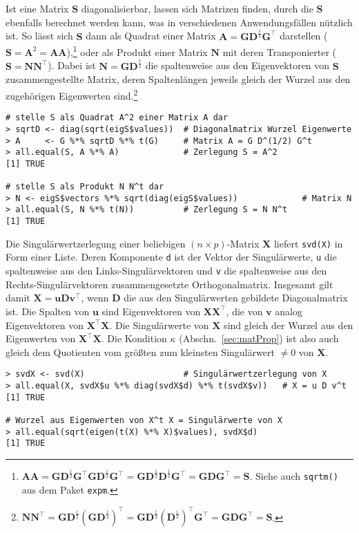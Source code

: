Ist eine Matrix $\bm{S}$ diagonalisierbar, lassen sich Matrizen finden, durch die $\bm{S}$ ebenfalls berechnet werden kann, was in verschiedenen Anwendungsfällen nützlich ist. So lässt sich $\bm{S}$ dann als Quadrat einer Matrix $\bm{A} = \bm{G} \bm{D}^{\frac{1}{2}} \bm{G}^{\top}$ darstellen ($\bm{S} = \bm{A}^{2} = \bm{A} \bm{A}$),\footnote{$\bm{A} \bm{A} = \bm{G} \bm{D}^{\frac{1}{2}} \bm{G}^{\top} \bm{G} \bm{D}^{\frac{1}{2}} \bm{G}^{\top} = \bm{G} \bm{D}^{\frac{1}{2}} \bm{D}^{\frac{1}{2}} \bm{G}^{\top} = \bm{G} \bm{D} \bm{G}^{\top} = \bm{S}$. Siehe auch \lstinline!sqrtm()! aus dem Paket \lstinline!expm!.} oder als Produkt einer Matrix $\bm{N}$ mit deren Transponierter ($\bm{S} = \bm{N} \bm{N}^{\top}$). Dabei ist $\bm{N} = \bm{G} \bm{D}^{\frac{1}{2}}$ die spaltenweise aus den Eigenvektoren von $\bm{S}$ zusammengestellte Matrix, deren Spaltenlängen jeweils gleich der Wurzel aus den zugehörigen Eigenwerten sind.\footnote{$\bm{N} \bm{N}^{\top} = \bm{G} \bm{D}^{\frac{1}{2}} (\bm{G} \bm{D}^{\frac{1}{2}})^{\top} = \bm{G} \bm{D}^{\frac{1}{2}} (\bm{D}^{\frac{1}{2}})^{\top} \bm{G}^{\top} = \bm{G} \bm{D} \bm{G}^{\top} = \bm{S}$.}
\begin{lstlisting}
# stelle S als Quadrat A^2 einer Matrix A dar
> sqrtD <- diag(sqrt(eigS$values))  # Diagonalmatrix Wurzel Eigenwerte
> A     <- G %*% sqrtD %*% t(G)     # Matrix A = G D^(1/2) G^t
> all.equal(S, A %*% A)             # Zerlegung S = A^2
[1] TRUE

# stelle S als Produkt N N^t dar
> N <- eigS$vectors %*% sqrt(diag(eigS$values))             # Matrix N
> all.equal(S, N %*% t(N))          # Zerlegung S = N N^t
[1] TRUE
\end{lstlisting}

Die Singulärwertzerlegung einer beliebigen $(n \times p)$-Matrix $\bm{X}$ liefert  \lstinline!svd(X)! in Form einer Liste. Deren Komponente \lstinline!d! ist der Vektor der Singulärwerte, \lstinline!u! die spaltenweise aus den Links-Singulärvektoren und \lstinline!v! die spaltenweise aus den Rechts-Singulärvektoren zusammengesetzte Orthogonalmatrix. Insgesamt gilt damit $\bm{X} = \bm{u} \bm{D} \bm{v}^{\top}$, wenn $\bm{D}$ die aus den Singulärwerten gebildete Diagonalmatrix ist. Die Spalten von $\bm{u}$ sind Eigenvektoren von $\bm{X} \bm{X}^{\top}$, die von $\bm{v}$ analog Eigenvektoren von $\bm{X}^{\top} \bm{X}$. Die Singulärwerte von $\bm{X}$ sind gleich der Wurzel aus den Eigenwerten von $\bm{X}^{\top} \bm{X}$. Die Kondition $\kappa$ (Abschn.\ \ref{sec:matProp}) ist also auch gleich dem Quotienten vom größten zum kleinsten Singulärwert $\neq 0$ von $\bm{X}$.
\begin{lstlisting}
> svdX <- svd(X)                    # Singulärwertzerlegung von X
> all.equal(X, svdX$u %*% diag(svdX$d) %*% t(svdX$v))   # X = u D v^t
[1] TRUE

# Wurzel aus Eigenwerten von X^t X = Singulärwerte von X
> all.equal(sqrt(eigen(t(X) %*% X)$values), svdX$d)
[1] TRUE
\end{lstlisting}

